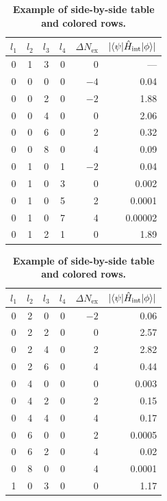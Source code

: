 \begin{table}
	\centering 
	\caption{\textbf{Example of side-by-side table and colored rows.} \blindtext}
	\label{tab:table2}
	\vspace{5ex}
	\begin{tabular}{ccccrr} 
		\toprule
		$l_1$ & $l_2$ & $l_3$ & $l_4$ & $\Delta N_\text{ex}$ & $|\langle \psi | \hat{H}_\text{int} | \phi \rangle|$  \\ 
		\midrule 
		\rowcolor{pqred} 0 & 1 & 3 & 0 & 0 & ---\\
		0 & 0 & 0 & 0 & $-4$ & 0.04\\
		0 & 0 & 2 & 0 & $-2$ & 1.88\\
		\rowcolor{pqblue} 0 & 0 & 4 & 0 & 0 & 2.06\\
		0 & 0 & 6 & 0 & 2 & 0.32\\
		0 & 0 & 8 & 0 & 4 & 0.09\\
		0 & 1 & 0 & 1 & $-2$ & 0.04\\
		\rowcolor{pqyellow} 0 & 1 & 0 & 3 & 0 & 0.002\\
		0 & 1 & 0 & 5 & 2 & 0.0001\\
		0 & 1 & 0 & 7 & 4 & 0.00002\\
		\rowcolor{pqblue} 0 & 1 & 2 & 1 & 0 & 1.89\\
		\bottomrule
	\end{tabular}
	\hspace{0.5cm}
	\begin{tabular}{ccccrr} 
		\toprule
		$l_1$ & $l_2$ & $l_3$ & $l_4$ & $\Delta N_\text{ex}$ & $|\langle \psi | \hat{H}_\text{int} | \phi \rangle|$  \\ 
		\midrule 
		0 & 2 & 0 & 0 & $-2$ & 0.06\\
		\rowcolor{pqblue} 0 & 2 & 2 & 0 & 0 & 2.57\\
		0 & 2 & 4 & 0 & 2 & 2.82\\
		0 & 2 & 6 & 0 & 4 & 0.44\\
		\rowcolor{pqyellow} 0 & 4 & 0 & 0 & 0 & 0.003\\
		0 & 4 & 2 & 0 & 2 & 0.15\\
		0 & 4 & 4 & 0 & 4 & 0.17\\
		0 & 6 & 0 & 0 & 2 & 0.0005\\
		0 & 6 & 2 & 0 & 4 & 0.02\\
		0 & 8 & 0 & 0 & 4 & 0.0001\\
		\rowcolor{pqblue} 1 & 0 & 3 & 0 & 0 & 1.17\\
		\bottomrule
	\end{tabular}
\end{table}


